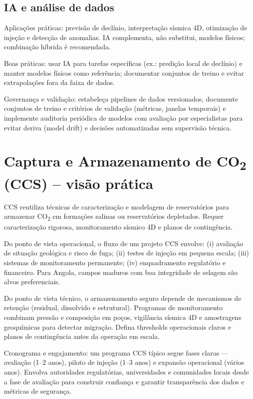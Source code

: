 \documentclass[
  12pt,
  a4paper,
  oneside,
  brazilian,
  sumario=tradicional
]{abntex2}
\begin{document}
\section{IA e análise de dados}
Aplicações práticas: previsão de declínio, interpretação sísmica 4D, otimização
de injeção e detecção de anomalias. IA complementa, não substitui, modelos
físicos; combinação híbrida é recomendada.

Boas práticas: usar IA para tarefas específicas (ex.: predição local de
declínio) e manter modelos físicos como referência; documentar conjuntos de
treino e evitar extrapolações fora da faixa de dados.

Governança e validação: estabeleça pipelines de dados versionados, documente
conjuntos de treino e critérios de validação (métricas, janelas temporais) e
implemente auditoria periódica de modelos com avaliação por especialistas para
evitar deriva (model drift) e decisões automatizadas sem supervisão técnica.

\chapter{Captura e Armazenamento de CO\textsubscript{2} (CCS) -- visão prática}
CCS reutiliza técnicas de caracterização e modelagem de reservatórios para
armazenar CO\textsubscript{2} em formações salinas ou reservatórios depletados.
Requer caracterização rigorosa, monitoramento sísmico 4D e planos de contingência.

Do ponto de vista operacional, o fluxo de um projeto CCS envolve: (i) avaliação de
situação geológica e risco de fuga; (ii) testes de injeção em pequena escala;
(iii) sistemas de monitoramento permanente; (iv) enquadramento regulatório e
financeiro. Para Angola, campos maduros com boa integridade de selagem são
alvos preferenciais.

Do ponto de vista técnico, o armazenamento seguro depende de mecanismos de retenção (residual, dissolvido e estrutural). Programas de monitoramento combinam pressão e composição em poços, vigilância sísmica 4D e amostragens geoquímicas para detectar migração. Defina thresholds operacionais claros e planos de contingência antes da operação em escala.

Cronograma e engajamento: um programa CCS típico segue fases claras — avaliação (1--2 anos), piloto de injeção (1--3 anos) e expansão operacional (vários anos). Envolva autoridades regulatórias, universidades e comunidades locais desde a fase de avaliação para construir confiança e garantir transparência dos dados e métricas de segurança.
\end{document}
